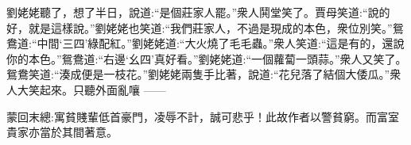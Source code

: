 \begin{parag}
劉姥姥聽了，想了半日，說道:“是個莊家人罷。”衆人鬨堂笑了。賈母笑道:“說的好，就是這樣說。”劉姥姥也笑道:“我們莊家人，不過是現成的本色，衆位別笑。”鴛鴦道:“中間‘三四’綠配紅。”劉姥姥道:“大火燒了毛毛蟲。”衆人笑道:“這是有的，還說你的本色。”鴛鴦道:“右邊‘幺四’真好看。”劉姥姥道:“一個蘿蔔一頭蒜。”衆人又笑了。鴛鴦笑道:“湊成便是一枝花。”劉姥姥兩隻手比著，說道:“花兒落了結個大倭瓜。”衆人大笑起來。只聽外面亂嚷 ——
\end{parag}


\begin{parag}
    \begin{note}蒙回末總:寓貧賤輩低首豪門，凌辱不計，誠可悲乎！此故作者以警貧窮。而富室貴家亦當於其間著意。\end{note}
\end{parag}

